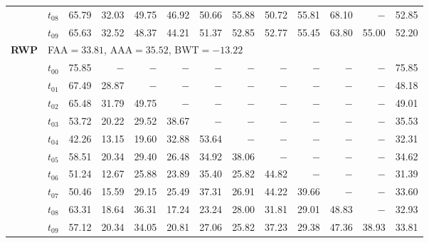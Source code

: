 \begin{table}[ht]
\begin{tabular}{@{}l l r r r r r r r r r r r@{}}
 & $t_{08}$ & 65.79 & 32.03 & 49.75 & 46.92 & 50.66 & 55.88 & 50.72 & 55.81 & 68.10 & $-$ & 52.85 \\
 & $t_{09}$ & 65.63 & 32.52 & 48.37 & 44.21 & 51.37 & 52.85 & 52.77 & 55.45 & 63.80 & 55.00 & 52.20 \\
\midrule
\multirow{11}{*}{\textbf{RWP}} & \multicolumn{12}{l}{\quad\small FAA$=33.81$,\; AAA$=35.52$,\; BWT$=-13.22$} \\
 & $t_{00}$ & 75.85 & $-$ & $-$ & $-$ & $-$ & $-$ & $-$ & $-$ & $-$ & $-$ & 75.85 \\
 & $t_{01}$ & 67.49 & 28.87 & $-$ & $-$ & $-$ & $-$ & $-$ & $-$ & $-$ & $-$ & 48.18 \\
 & $t_{02}$ & 65.48 & 31.79 & 49.75 & $-$ & $-$ & $-$ & $-$ & $-$ & $-$ & $-$ & 49.01 \\
 & $t_{03}$ & 53.72 & 20.22 & 29.52 & 38.67 & $-$ & $-$ & $-$ & $-$ & $-$ & $-$ & 35.53 \\
 & $t_{04}$ & 42.26 & 13.15 & 19.60 & 32.88 & 53.64 & $-$ & $-$ & $-$ & $-$ & $-$ & 32.31 \\
 & $t_{05}$ & 58.51 & 20.34 & 29.40 & 26.48 & 34.92 & 38.06 & $-$ & $-$ & $-$ & $-$ & 34.62 \\
 & $t_{06}$ & 51.24 & 12.67 & 25.88 & 23.89 & 35.40 & 25.82 & 44.82 & $-$ & $-$ & $-$ & 31.39 \\
 & $t_{07}$ & 50.46 & 15.59 & 29.15 & 25.49 & 37.31 & 26.91 & 44.22 & 39.66 & $-$ & $-$ & 33.60 \\
 & $t_{08}$ & 63.31 & 18.64 & 36.31 & 17.24 & 23.24 & 28.00 & 31.81 & 29.01 & 48.83 & $-$ & 32.93 \\
 & $t_{09}$ & 57.12 & 20.34 & 34.05 & 20.81 & 27.06 & 25.82 & 37.23 & 29.38 & 47.36 & 38.93 & 33.81 \\
\bottomrule
\end{tabular}
\end{table}

